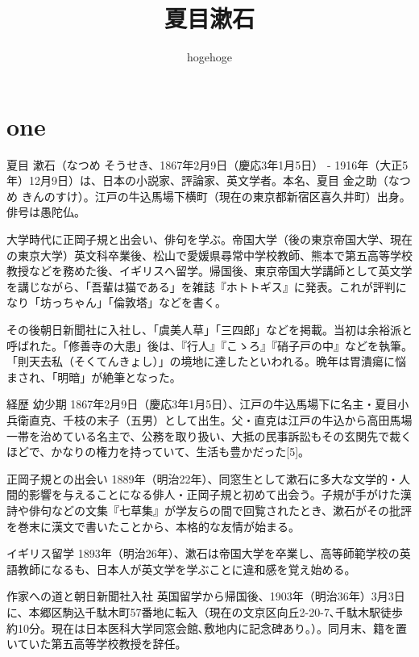 \documentclass[autodetect-engine, dvipdfmx-if-dvi, ja=standard, 10.5pt, onecolumn]{bxjsarticle}
\title{夏目漱石}
\author{hogehoge}
\begin{document}
\maketitle

\section{one}
夏目 漱石（なつめ そうせき、1867年2月9日（慶応3年1月5日） - 1916年（大正5年）12月9日）は、日本の小説家、評論家、英文学者。本名、夏目 金之助（なつめ きんのすけ）。江戸の牛込馬場下横町（現在の東京都新宿区喜久井町）出身。俳号は愚陀仏。

大学時代に正岡子規と出会い、俳句を学ぶ。帝国大学（後の東京帝国大学、現在の東京大学）英文科卒業後、松山で愛媛県尋常中学校教師、熊本で第五高等学校教授などを務めた後、イギリスへ留学。帰国後、東京帝国大学講師として英文学を講じながら、「吾輩は猫である」を雑誌『ホトトギス』に発表。これが評判になり「坊っちゃん」「倫敦塔」などを書く。

その後朝日新聞社に入社し、「虞美人草」「三四郎」などを掲載。当初は余裕派と呼ばれた。「修善寺の大患」後は、『行人』『こゝろ』『硝子戸の中』などを執筆。「則天去私（そくてんきょし）」の境地に達したといわれる。晩年は胃潰瘍に悩まされ、「明暗」が絶筆となった。

経歴
幼少期
1867年2月9日（慶応3年1月5日）、江戸の牛込馬場下に名主・夏目小兵衛直克、千枝の末子（五男）として出生。父・直克は江戸の牛込から高田馬場一帯を治めている名主で、公務を取り扱い、大抵の民事訴訟もその玄関先で裁くほどで、かなりの権力を持っていて、生活も豊かだった[5]。

正岡子規との出会い
1889年（明治22年）、同窓生として漱石に多大な文学的・人間的影響を与えることになる俳人・正岡子規と初めて出会う。子規が手がけた漢詩や俳句などの文集『七草集』が学友らの間で回覧されたとき、漱石がその批評を巻末に漢文で書いたことから、本格的な友情が始まる。

イギリス留学
1893年（明治26年）、漱石は帝国大学を卒業し、高等師範学校の英語教師になるも、日本人が英文学を学ぶことに違和感を覚え始める。

作家への道と朝日新聞社入社
英国留学から帰国後、1903年（明治36年）3月3日に、本郷区駒込千駄木町57番地に転入（現在の文京区向丘2-20-7､千駄木駅徒歩約10分。現在は日本医科大学同窓会館､敷地内に記念碑あり｡）。同月末、籍を置いていた第五高等学校教授を辞任。
\end{document}
